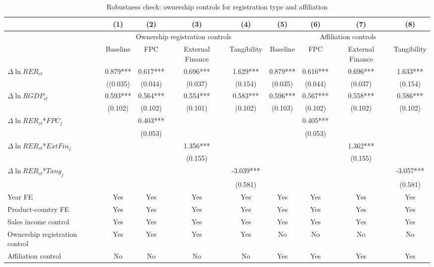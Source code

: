 \documentclass[12pt]{article}
\begin{document}
\begin{table}
	\centering
	\caption{Robustness check: ownership controls for registration type and affiliation}
	\begin{threeparttable}
		\begin{tabular}{lcccccccc}
			\toprule
			& (1)   & (2)   & (3)   & (4) &  (5)  &  (6)  & (7)  & (8)\\
			\midrule
			& \multicolumn{4}{c}{Ownership registration controls} & \multicolumn{4}{c}{Affiliation controls}\\
			& Baseline & FPC   & External Finance & Tangibility & Baseline & FPC & External Finance & Tangibility\\
			\midrule
			$\Delta \ln RER_{ct}$ & 0.879*** & 0.617*** & 0.696*** & 1.629*** & 0.879*** & 0.616*** & 0.696*** & 1.633*** \\
			& ((0.035) & (0.044) & (0.037) & (0.154) & (0.035) & (0.044) & (0.037) & (0.154) \\
			$\Delta \ln RGDP_{ct}$ & 0.593*** & 0.564*** & 0.554*** & 0.583*** & 0.596*** & 0.567*** & 0.558*** & 0.586*** \\
			& (0.102) & (0.102) & (0.101) & (0.102) & (0.103) & (0.102) & (0.102) & (0.102) \\
			$\Delta \ln RER_{ct}$*$FPC_{j}$ &    & 0.403*** &       &       &       & 0.405*** &       &  \\
			&  & (0.053) &       &       &       & (0.053) &       &  \\
			$\Delta \ln RER_{ct}$*$ExtFin_{j}$ &    &       & 1.356*** &       &       &       & 1.362*** &  \\
			&   &       & (0.155) &       &       &       & (0.155) &  \\
			$\Delta \ln RER_{ct}$*$Tang_{j}$ &     &       &       & -3.039*** &       &       &       & -3.057*** \\
			&   &       &       & (0.581) &       &       &       & (0.581) \\
			Year FE  &  Yes   & Yes   & Yes   & Yes & Yes   & Yes   & Yes   & Yes\\
			Product-country FE &  Yes   & Yes   & Yes   & Yes & Yes   & Yes   & Yes   & Yes\\
			Sales income control &  Yes   & Yes   & Yes   & Yes & Yes   & Yes   & Yes   & Yes\\
			Ownership registration control &  Yes   & Yes & Yes  & Yes & No & No & No & No\\
			Affiliation control & No & No & No & No &  Yes  & Yes & Yes  & Yes \\

\end{tabular}
\end{threeparttable}
\end{table}
\end{document}
